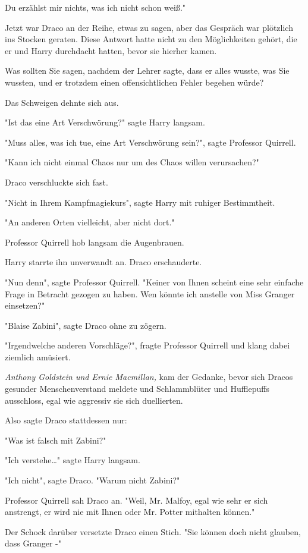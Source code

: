 {Du erzählst mir nichts, was ich nicht schon weiß."

Jetzt war Draco an der Reihe, etwas zu sagen, aber das Gespräch war plötzlich ins Stocken geraten. Diese Antwort hatte nicht zu den Möglichkeiten gehört, die er und Harry durchdacht hatten, bevor sie hierher kamen.

Was sollten Sie sagen, nachdem der Lehrer sagte, dass er alles wusste, was Sie wussten, und er trotzdem einen offensichtlichen Fehler begehen würde?

Das Schweigen dehnte sich aus.

"Ist das eine Art Verschwörung?" sagte Harry langsam.

"Muss alles, was ich tue, eine Art Verschwörung sein?", sagte Professor Quirrell.

"Kann ich nicht einmal Chaos nur um des Chaos willen verursachen?"

Draco verschluckte sich fast.

"Nicht in Ihrem Kampfmagiekurs", sagte Harry mit ruhiger Bestimmtheit.

"An anderen Orten vielleicht, aber nicht dort."

Professor Quirrell hob langsam die Augenbrauen.

Harry starrte ihn unverwandt an. Draco erschauderte.

"Nun denn", sagte Professor Quirrell. "Keiner von Ihnen scheint eine sehr einfache Frage in Betracht gezogen zu haben. Wen könnte ich anstelle von Miss Granger einsetzen?"

"Blaise Zabini", sagte Draco ohne zu zögern.

"Irgendwelche anderen Vorschläge?", fragte Professor Quirrell und klang dabei ziemlich amüsiert.

\emph{Anthony Goldstein und Ernie Macmillan,} kam der Gedanke, bevor sich Dracos gesunder Menschenverstand meldete und Schlammblüter und Hufflepuffs ausschloss, egal wie aggressiv sie sich duellierten.

Also sagte Draco stattdessen nur:

"Was ist falsch mit Zabini?"

"Ich verstehe…" sagte Harry langsam.

"Ich nicht", sagte Draco. "Warum nicht Zabini?"

Professor Quirrell sah Draco an. "Weil, Mr. Malfoy, egal wie sehr er sich anstrengt, er wird nie mit Ihnen oder Mr. Potter mithalten können."

Der Schock darüber versetzte Draco einen Stich. "Sie können doch nicht glauben, dass Granger -"

}
